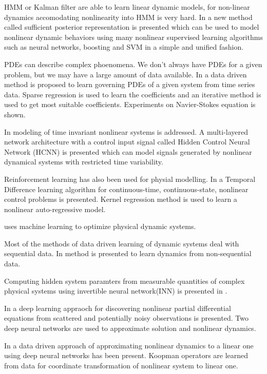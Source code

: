 \documentclass[conference]{IEEEtran}
\begin{document}
HMM or Kalman filter are able to learn linear dynamic models, for non-linear dynamics accomodating nonlinearity into HMM is very hard. In \cite{langford2009nonlinear} a new method called sufficient posterior representation is presented which can be used to model nonlinear dynamic behaviors using many nonlinear supervised learning algorithms such as neural networks, boosting and SVM in a simple and unified fashion.

PDEs can describe complex phoenomena. We don't always have PDEs for a given problem, but we may have a large amount of data available. In \cite{rudy2017datadriven} a data driven method is proposed to learn governing PDEs of a given system from time series data. Sparse regression is used to learn the coefficients and an iterative method is used to get most suitable coefficients. Experiments on Navier-Stokes equation is shown.

In \cite{levin1991nips} modeling of time invariant nonlinear systems is addressed. A multi-layered network architecture with a control input signal called Hidden Control Neural Network (HCNN) is presented which can model signals generated by nonlinear dynamical systems with restricted time variability.

Reinforcement learning has also been used for physial modelling. In \cite{doya1996nips} a Temporal Difference learning algorithm for continuous-time, continuous-state, nonlinear control problems is presented. Kernel regression method is used to learn a nonlinear auto-regressive model.

\cite{hermans2014automated} uses machine learning to optimize physical dynamic systems.

Most of the methods of data driven learning of dynamic systems deal with sequential data. In \cite{john2009nonlinear} method is presented to learn dynamics from non-sequential data.

Computing hidden system paramters from measurable quantities of complex physical systems using invertible neural network(INN) is presented in \cite{ardizzone2018analyzing}.

In \cite{raissi2018deep} a deep learning appraoch for discovering nonlinear partial differential equations from scattered and potentially noisy observations is presented. Two deep neural networks are used to approximate solution and nonlinear dynamics.

In \cite{lusch2017deep} a data driven approach of approximating nonlinear dynamics to a linear one using deep neural networks has been present. Koopman operators are learned from data for coordinate transformation of nonlinear system to linear one.
\end{document}
